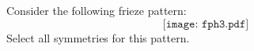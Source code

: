 \documentclass{ximera}
\author{Bart Snapp}
\begin{document}
\begin{exercise}
  Consider the following frieze pattern:
  \[
  \texttt{[image: fph3.pdf]}
  \]
  Select all symmetries for this pattern.
  \begin{selectAll}
  \end{selectAll}
\end{exercise}
\end{document}
